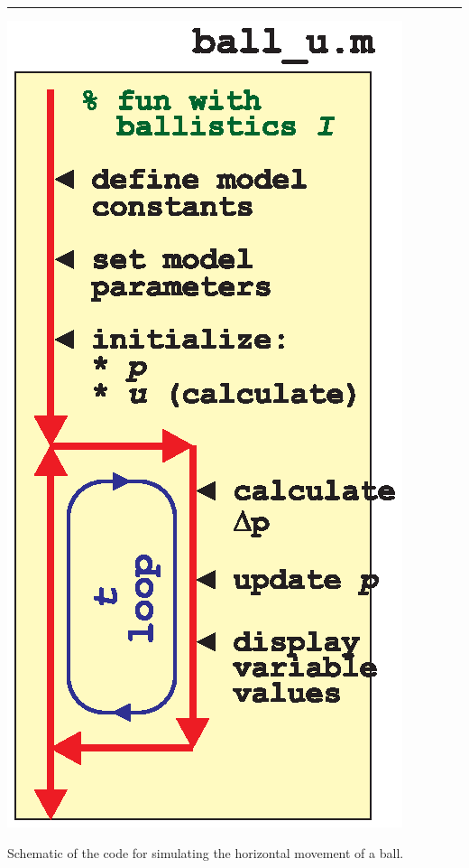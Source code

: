 \documentclass{tufte-book} %
\begin{document}
\vspace{-1mm}
\noindent\rule{4cm}{0.5pt}
\vspace{-2mm}

\begin{marginfigure}[3.0in]
\includegraphics[width=\linewidth]{ch9-schematic-ball_u.eps}
\caption{Schematic of the code for simulating the horizontal movement of a ball.}
\label{fig:ch9-schematic-ball_u}
\end{marginfigure}
\end{document}
